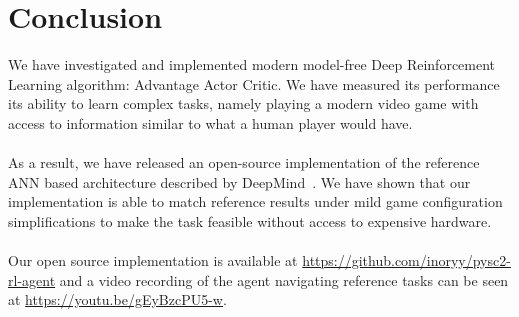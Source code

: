\chapter*{Conclusion}

We have investigated and implemented modern model-free Deep Reinforcement Learning algorithm: Advantage Actor Critic. We have measured its performance its ability to learn complex tasks, namely playing a modern video game with access to information similar to what a human player would have. 
\\\\
As a result, we have released an open-source implementation of the reference ANN based architecture described by DeepMind~\cite{Vinyals2017}. We have shown that our implementation is able to match reference results under mild game configuration simplifications to make the task feasible without access to expensive hardware. 
\\\\
Our open source implementation is available at \url{https://github.com/inoryy/pysc2-rl-agent} and a video recording of the agent navigating reference tasks can be seen at \url{https://youtu.be/gEyBzcPU5-w}.

\newpage